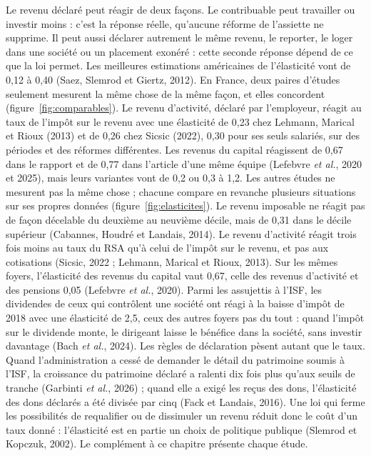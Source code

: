 \documentclass[11pt,a4paper]{article}
\begin{document}
Le revenu déclaré peut réagir de deux façons. Le contribuable peut travailler ou investir moins :
c'est la réponse réelle, qu'aucune réforme de l'assiette ne supprime. Il peut aussi déclarer
autrement le même revenu, le reporter, le loger dans une société ou un placement exonéré : cette
seconde réponse dépend de ce que la loi permet. Les meilleures estimations américaines de
l'élasticité vont de 0,12 à 0,40 (Saez, Slemrod et Giertz, 2012). En France, deux paires d'études
seulement mesurent la même chose de la même façon, et elles concordent
(figure~\ref{fig:comparables}). Le revenu d'activité, déclaré par l'employeur, réagit au taux de
l'impôt sur le revenu avec une élasticité de 0,23 chez Lehmann, Marical et Rioux (2013) et de 0,26
chez Sicsic (2022), 0,30 pour ses seuls salariés, sur des périodes et des réformes différentes. Les
revenus du capital réagissent de 0,67 dans le rapport et de 0,77 dans l'article d'une même équipe
(Lefebvre \emph{et al.}, 2020 et 2025), mais leurs variantes vont de 0,2 ou 0,3 à 1,2. Les autres
études ne mesurent pas la même chose ; chacune compare en revanche plusieurs situations sur ses
propres données (figure~\ref{fig:elasticites}). Le revenu imposable ne réagit pas de façon
décelable du deuxième au neuvième décile, mais de 0,31 dans le décile supérieur (Cabannes, Houdré
et Landais, 2014). Le revenu d'activité réagit trois fois moins au taux du RSA qu'à celui de l'impôt
sur le revenu, et pas aux cotisations (Sicsic, 2022 ; Lehmann, Marical et Rioux, 2013). Sur les
mêmes foyers, l'élasticité des revenus du capital vaut 0,67, celle des revenus d'activité et des
pensions 0,05 (Lefebvre \emph{et al.}, 2020). Parmi les assujettis à l'ISF, les dividendes de ceux
qui contrôlent une société ont réagi à la baisse d'impôt de 2018 avec une élasticité de 2,5, ceux
des autres foyers pas du tout : quand l'impôt sur le dividende monte, le dirigeant laisse le
bénéfice dans la société, sans investir davantage (Bach \emph{et al.}, 2024). Les règles de
déclaration pèsent autant que le taux. Quand l'administration a cessé de demander le détail du
patrimoine soumis à l'ISF, la croissance du patrimoine déclaré a ralenti dix fois plus qu'aux seuils
de tranche (Garbinti \emph{et al.}, 2026) ; quand elle a exigé les reçus des dons, l'élasticité des
dons déclarés a été divisée par cinq (Fack et Landais, 2016). Une loi qui ferme les possibilités de
requalifier ou de dissimuler un revenu réduit donc le coût d'un taux donné : l'élasticité est en
partie un choix de politique publique (Slemrod et Kopczuk, 2002). Le complément à ce chapitre
présente chaque étude.
\end{document}
